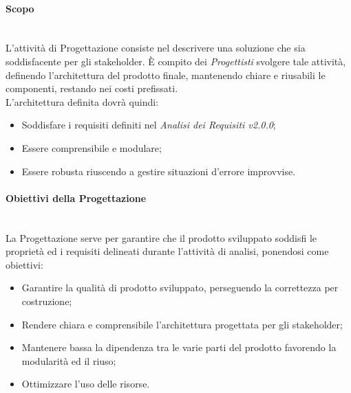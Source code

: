 \paragraph{Scopo}
\label{Progettazione_Scopo} \-\\
L'attività di Progettazione consiste nel descrivere una soluzione che sia soddisfacente per gli stakeholder\glossario. È compito dei \textit{Progettisti} svolgere tale attività, definendo l'architettura del prodotto finale, mantenendo chiare e riusabili le componenti, restando nei costi prefissati.\\
L'architettura definita dovrà quindi:
\begin{itemize}
	\item Soddisfare i requisiti definiti nel \textit{Analisi dei Requisiti v2.0.0};
	\item Essere comprensibile e modulare;
	\item Essere robusta riuscendo a gestire situazioni d'errore improvvise.
\end{itemize}

\paragraph{Obiettivi della Progettazione} \-\\
\label{Progettazione_Obiettivi}
La Progettazione serve per garantire che il prodotto sviluppato soddisfi le proprietà ed i requisiti delineati durante l'attività di analisi, ponendosi come obiettivi:
\begin{itemize}
	\item Garantire la qualità di prodotto sviluppato, perseguendo la correttezza per costruzione;
	\item Rendere chiara e comprensibile l'architettura progettata per gli stakeholder;
	\item Mantenere bassa la dipendenza tra le varie parti del prodotto favorendo la modularità ed il riuso;
	\item Ottimizzare l'uso delle risorse.
\end{itemize}


